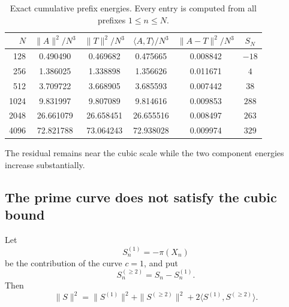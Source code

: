 \documentclass[11pt]{article}
\theoremstyle{definition}
\newcommand{\1}{\mathbf{1}}
\begin{document}
\begin{table}[htbp]
\centering
\caption{Exact cumulative prefix energies.  Every entry is computed from all prefixes $1\le n\le N$.}
\label{tab:prefix-energy-numerical}
\scriptsize
\setlength{\tabcolsep}{4.2pt}
\begin{tabular}{rccccc}
\toprule
$N$ &
$\|A\|^2/N^3$ &
$\|T\|^2/N^3$ &
$\langle A,T\rangle/N^3$ &
$\|A-T\|^2/N^3$ &
$S_N$\\
\midrule
128  & 0.490490 & 0.469682 & 0.475665 & 0.008842 & $-18$\\
256  & 1.386025 & 1.338898 & 1.356626 & 0.011671 & $4$\\
512  & 3.709722 & 3.668905 & 3.685593 & 0.007442 & $38$\\
1024 & 9.831997 & 9.807089 & 9.814616 & 0.009853 & $288$\\
2048 & 26.661079 & 26.658451 & 26.655516 & 0.008497 & $263$\\
4096 & 72.821788 & 73.064243 & 72.938028 & 0.009974 & $329$\\
\bottomrule
\end{tabular}
\end{table}

The residual remains near the cubic scale while the two component energies increase substantially.

\subsection{The prime curve does not satisfy the cubic bound}

Let
\[
 S_n^{(1)}=-\pi(X_n)
\]
be the contribution of the curve $c=1$, and put
\[
 S_n^{(\ge2)}=S_n-S_n^{(1)}.
\]
Then
\begin{equation}
 \|S\|^2
 =
 \|S^{(1)}\|^2
 +
 \|S^{(\ge2)}\|^2
 +
 2\langle S^{(1)},S^{(\ge2)}\rangle.
 \label{eq:prime-rest-energy}
\end{equation}
\end{document}
